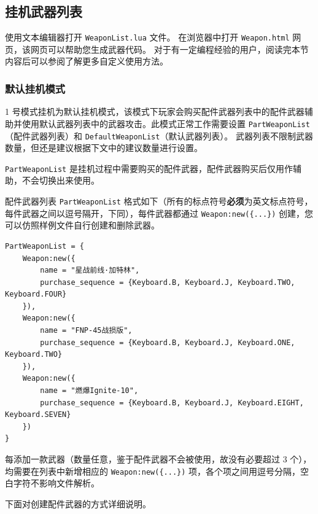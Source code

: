 \subsection{挂机武器列表}

使用文本编辑器打开 \lstinline{WeaponList.lua} 文件。
在浏览器中打开 \lstinline{Weapon.html} 网页，该网页可以帮助您生成武器代码。
对于有一定编程经验的用户，阅读完本节内容后可以参阅了解更多自定义使用方法。

\subsubsection{默认挂机模式}

1 号模式挂机为默认挂机模式，该模式下玩家会购买配件武器列表中的配件武器辅助并使用默认武器列表中的武器攻击。此模式正常工作需要设置 \lstinline{PartWeaponList}（配件武器列表）和 \lstinline{DefaultWeaponList}（默认武器列表）。
武器列表不限制武器数量，但还是建议根据下文中的建议数量进行设置。

\lstinline{PartWeaponList} 是挂机过程中需要购买的配件武器，配件武器购买后仅用作辅助，不会切换出来使用。

配件武器列表 \lstinline{PartWeaponList} 格式如下（所有的标点符号\textbf{\color{red}必须}为英文标点符号，每件武器之间以逗号隔开，下同），每件武器都通过 \lstinline|Weapon:new({...})| 创建，您可以仿照样例文件自行创建和删除武器。

\begin{verbatim}
PartWeaponList = {
    Weapon:new({
        name = "星战前线·加特林",
        purchase_sequence = {Keyboard.B, Keyboard.J, Keyboard.TWO, Keyboard.FOUR}
    }),
    Weapon:new({
        name = "FNP-45战损版",
        purchase_sequence = {Keyboard.B, Keyboard.J, Keyboard.ONE, Keyboard.TWO}
    }),
    Weapon:new({
        name = "燃爆Ignite-10",
        purchase_sequence = {Keyboard.B, Keyboard.J, Keyboard.EIGHT, Keyboard.SEVEN}
    })
}
\end{verbatim}

每添加一款武器（数量任意，鉴于配件武器不会被使用，故没有必要超过 3 个），均需要在列表中新增相应的 \lstinline|Weapon:new({...})| 项，各个项之间用逗号分隔，空白字符不影响文件解析。

下面对创建配件武器的方式详细说明。

